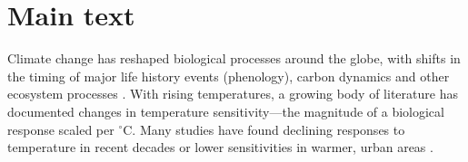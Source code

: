 \documentclass[11pt,letter]{article}
\begin{document}

\vspace{5ex}


\newpage
\linenumbers
\section{Main text} %
Climate change has reshaped biological processes around the globe, with shifts in the timing of major life history events (phenology), carbon dynamics and other ecosystem processes \citep{IPCC:2014sm}. With rising temperatures,  a growing body of literature has documented changes in temperature sensitivity---the magnitude of a biological response scaled per $^{\circ}$C. Many studies have found declining responses to temperature in recent decades \citep{fu2015,gusewell2017,piao2017,dai2019ag} or lower sensitivities in warmer, urban areas \citep{meng2020}.\\
\end{document}
